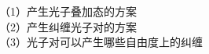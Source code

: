 \begin{frame}
    \frametitle{}
    \begin{tcolorbox3}[专题：光子叠加态与纠缠光子对]
        （1）产生光子叠加态的方案 \\
        （2）产生纠缠光子对的方案\\
        （3）光子对可以产生哪些自由度上的纠缠
    \end{tcolorbox3}
\end{frame}
